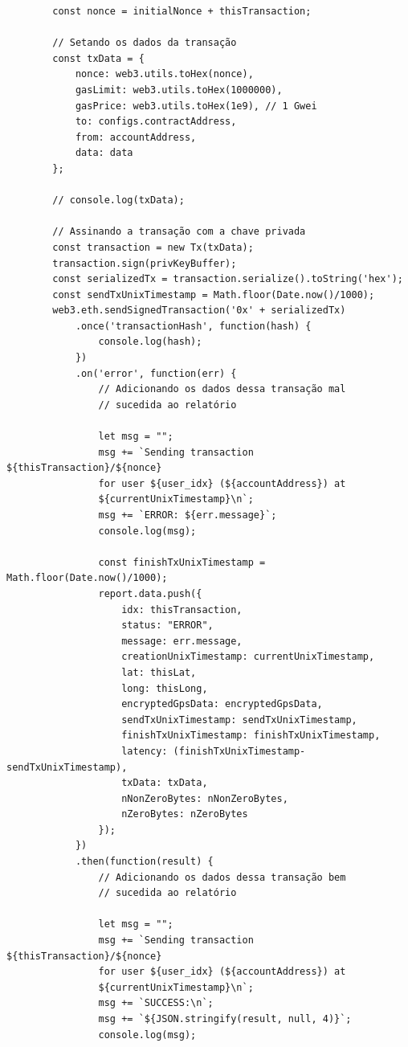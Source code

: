 \begin{code}
\begin{verbatim}
        const nonce = initialNonce + thisTransaction;

        // Setando os dados da transação
        const txData = {
            nonce: web3.utils.toHex(nonce),
            gasLimit: web3.utils.toHex(1000000),
            gasPrice: web3.utils.toHex(1e9), // 1 Gwei
            to: configs.contractAddress,
            from: accountAddress,
            data: data
        };

        // console.log(txData);

        // Assinando a transação com a chave privada
        const transaction = new Tx(txData);
        transaction.sign(privKeyBuffer);
        const serializedTx = transaction.serialize().toString('hex');
        const sendTxUnixTimestamp = Math.floor(Date.now()/1000);
        web3.eth.sendSignedTransaction('0x' + serializedTx)
            .once('transactionHash', function(hash) {
                console.log(hash);
            })
            .on('error', function(err) {
                // Adicionando os dados dessa transação mal 
                // sucedida ao relatório

                let msg = "";
                msg += `Sending transaction ${thisTransaction}/${nonce} 
                for user ${user_idx} (${accountAddress}) at 
                ${currentUnixTimestamp}\n`;
                msg += `ERROR: ${err.message}`;
                console.log(msg);

                const finishTxUnixTimestamp = Math.floor(Date.now()/1000);
                report.data.push({
                    idx: thisTransaction,
                    status: "ERROR",
                    message: err.message,
                    creationUnixTimestamp: currentUnixTimestamp,
                    lat: thisLat,
                    long: thisLong,
                    encryptedGpsData: encryptedGpsData,
                    sendTxUnixTimestamp: sendTxUnixTimestamp,
                    finishTxUnixTimestamp: finishTxUnixTimestamp,
                    latency: (finishTxUnixTimestamp-sendTxUnixTimestamp),
                    txData: txData,
                    nNonZeroBytes: nNonZeroBytes,
                    nZeroBytes: nZeroBytes
                });
            })
            .then(function(result) {
                // Adicionando os dados dessa transação bem 
                // sucedida ao relatório

                let msg = "";
                msg += `Sending transaction ${thisTransaction}/${nonce} 
                for user ${user_idx} (${accountAddress}) at 
                ${currentUnixTimestamp}\n`;
                msg += `SUCCESS:\n`;
                msg += `${JSON.stringify(result, null, 4)}`;
                console.log(msg);


\end{verbatim}
\end{code}
